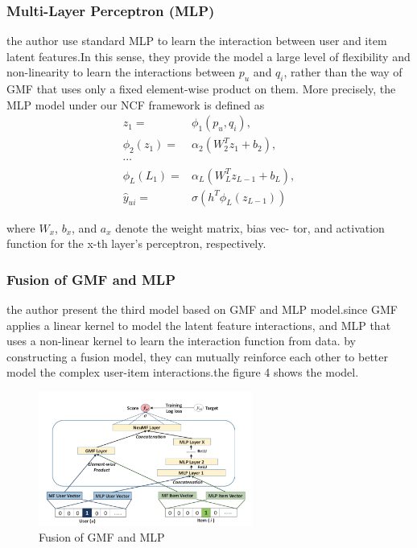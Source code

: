 \documentclass{acmtog} %
\begin{document}
\subsubsection{Multi-Layer Perceptron (MLP)}
the author use standard MLP to learn the interaction between user and item latent features.In this sense, they provide  the model a large level of flexibility and non-linearity to learn the interactions between $p_u$ and $q_i$, rather than the way of GMF that uses only a fixed element-wise product on them. More precisely, the MLP model under our NCF framework is defined as
\begin{equation}
\begin{aligned}
z_1=&\phi_1(p_u,q_i),\\
\phi_2(z_1)=&\alpha_{2}(W_2^Tz_1+b_2),\\
\cdots\\
\phi _L(L_1)=&\alpha_{L}(W_L^T z_{L-1}+b_L),\\
\hat y_{ui}=&\sigma(h^T\phi_L(z_{L-1}))
\end{aligned}
\end{equation}

where $W_x$, $b_x$, and $a_x$ denote the weight matrix, bias vec- tor, and activation function for the x-th layer’s perceptron, respectively.
\subsubsection{Fusion of GMF and MLP}
the author present the third model based on GMF and MLP model.since GMF  applies a linear kernel to model the latent feature interactions, and MLP that uses a non-linear kernel to learn the interaction function from data. by constructing a fusion model, they can mutually reinforce each other to better model the complex user-item interactions.the figure 4 shows the model.

\begin{figure}
	\centering
	\includegraphics[width=7cm]{pa4}
	\caption{Fusion of GMF and MLP}
	\label{fig:pa4}
\end{figure}
\end{document}
